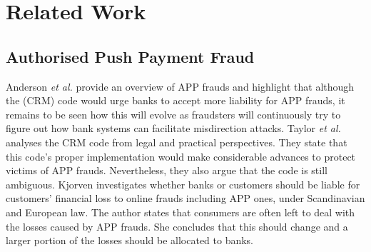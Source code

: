 


\section{Related Work}\label{sec::related-work}

\vspace{-.5mm}
\subsection{Authorised Push Payment Fraud}


Anderson \textit{et al.} \cite{anderson2019measuring} provide an overview of APP frauds and highlight that although the (CRM) code would urge banks to accept more liability for APP frauds, it remains to be seen how this will evolve as fraudsters will continuously try to figure out how bank systems can facilitate misdirection attacks. Taylor \textit{et al.} \cite{taylor2020new} analyses the CRM code from legal and practical perspectives. They state that this code's proper implementation would make considerable advances to protect victims of APP frauds. Nevertheless, they also argue that the code is still ambiguous. 
%
%
Kjorven \cite{kjorven2020pays} investigates whether banks or customers should be liable for customers' financial loss to online frauds including APP ones, under Scandinavian and European law. The author states that consumers are often left to deal with the losses caused by APP frauds. She concludes that this should change and a larger portion of the losses should be allocated to banks.

 \vspace{-3mm}
